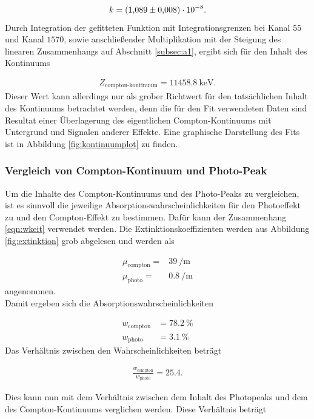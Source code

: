 \begin{align*}
  k = \SI{1.089+-0.008 e-8}{}.
\end{align*}
Durch Integration der gefitteten Funktion mit Integrationsgrenzen bei Kanal $55$ und Kanal $1570$, sowie anschließender
Multiplikation mit der Steigung des linearen Zusammenhangs auf Abschnitt \ref{subsec:a1}, ergibt sich für den Inhalt des
Kontinuums

\begin{align*}
  Z_\text{compton-kontinuum} = \SI{11458.8}{\kilo\electronvolt}.
\end{align*}
Dieser Wert kann allerdings nur als grober Richtwert für den tatsächlichen Inhalt des Kontinuums betrachtet werden,
denn die für den Fit verwendeten Daten sind Resultat einer Überlagerung des eigentlichen Compton-Kontinuums mit
Untergrund und Signalen anderer Effekte. Eine graphische Darstellung des Fits ist in Abbildung \ref{fig:kontinuumplot}
zu finden.

\subsubsection{Vergleich von Compton-Kontinuum und Photo-Peak}
\label{subsubsec:a23}
Um die Inhalte des Compton-Kontinuums und des Photo-Peaks zu vergleichen, ist es sinnvoll die jeweilige Absorptionswahrscheinlichkeiten für den Photoeffekt zu
und den Compton-Effekt zu bestimmen. Dafür kann der Zusammenhang \eqref{eqn:wkeit} verwendet werden.
Die Extinktionskoeffizienten werden aus Abbildung \ref{fig:extinktion} grob abgelesen und werden als

\begin{align*}
  \mu_\text{compton} = &\SI{39}{\per\meter}\\
  \mu_\text{photo} = &\SI{0.8}{\per\meter}
\end{align*}
angenommen. \\
Damit ergeben sich die Absorptionswahrscheinlichkeiten

\begin{align*}
  w_\text{compton} &= \SI{78.2}{\percent}\\
  w_\text{photo} &= \SI{3.1}{\percent}
\end{align*}
Das Verhältnis zwischen den Wahrscheinlichkeiten beträgt

\begin{align*}
    \frac{w_\text{compton}}{w_\text{photo}} = 25.4 .
\end{align*}

Dies kann nun mit dem Verhältnis zwischen dem Inhalt des Photopeaks und dem des Compton-Kontinuums verglichen werden.
Diese Verhältnis beträgt

